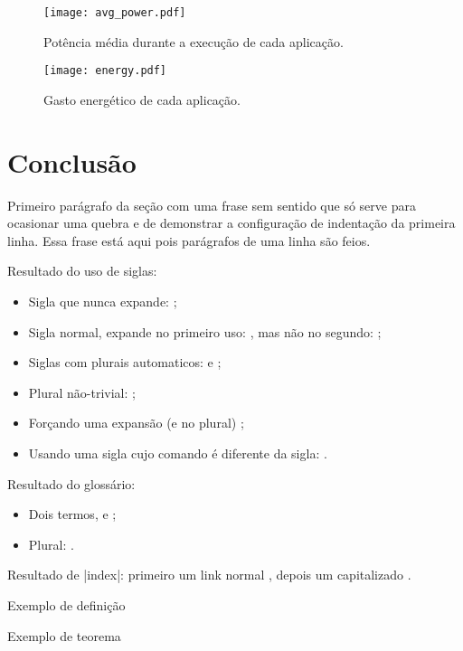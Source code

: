 \begin{figure}[h]
  \centering
  \caption{Potência média durante a execução de cada aplicação.}
  \label{fig:avgpower}
  \texttt{[image: avg\_power.pdf]}
\end{figure}

\begin{figure}[h]
  \centering
  \caption{Gasto energético de cada aplicação.}
  \label{fig:energy}
  \texttt{[image: energy.pdf]}
\end{figure}


\chapter{Conclusão}
\label{ch:conclusao}

 Primeiro parágrafo da seção com uma frase sem sentido que só serve para ocasionar uma quebra e de demonstrar a configuração de indentação da primeira linha. Essa frase está aqui pois parágrafos de uma linha são feios.

Resultado do uso de siglas:
\begin{itemize}
\item Sigla que nunca expande: \API;
\item Sigla normal, expande no primeiro uso: \DHT, mas não no segundo: \DHT;
\item Siglas com plurais automaticos: \APIs e \DHTs;
\item Plural não-trivial: \SQs;
\item Forçando uma expansão (e no plural) ;
\item Usando uma sigla cujo comando é diferente da sigla: \WTC.
\end{itemize}

Resultado do glossário:
\begin{itemize}
\item Dois termos, \polling e \proxy;
\item Plural: \proxys.
\end{itemize}

Resultado de \mla|index|: primeiro um link normal , depois um capitalizado .

\begin{defn}
  Exemplo de definição
\end{defn}

\begin{theorem}
  Exemplo de teorema
\end{theorem}

